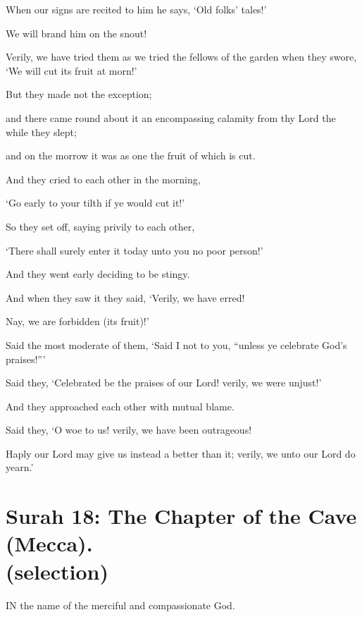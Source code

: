 \documentclass[fontsize=14pt, letterpaper, notitlepage, openany, DIV=12]{scrbook} %
\begin{document}
\noindent[68:15]
When our signs are recited to him he says, `Old folks' tales!'

\noindent[68:16]
We will brand him on the snout!

\noindent[68:17]
Verily, we have tried them as we tried the fellows of the garden when they swore, `We
will cut its fruit at morn!'

\noindent[68:18]
But they made not the exception;

\noindent[68:19]
and there came round about it an encompassing calamity from thy Lord the while they
slept;

\noindent[68:20]
and on the morrow it was as one the fruit of which is cut.

\noindent[68:21]
And they cried to each other in the morning,

\noindent[68:22]
`Go early to your tilth if ye would cut it!'

\noindent[68:23]
So they set off, saying privily to each other,

\noindent[68:24]
`There shall surely enter it today unto you no poor person!'

\noindent[68:25]
And they went early deciding to be stingy.

\noindent[68:26]
And when they saw it they said, `Verily, we have erred!

\noindent[68:27]
Nay, we are forbidden (its fruit)!'

\noindent[68:28]
Said the most moderate of them, `Said I not to you, ``unless ye celebrate God's praises!''\hspace{0.1em}'

\noindent[68:29]
Said they, `Celebrated be the praises of our Lord! verily, we were unjust!'

\noindent[68:30]
And they approached each other with mutual blame.

\noindent[68:31]
Said they, `O woe to us! verily, we have been outrageous!

\noindent[68:32]
Haply our Lord may give us instead a better than it; verily, we unto our Lord do yearn.'


\section[Surah 18: The Chapter of the Cave (Mecca).]{Surah 18: The Chapter of the Cave (Mecca).\\ (selection)}


IN the name of the merciful and compassionate God.
\end{document}
